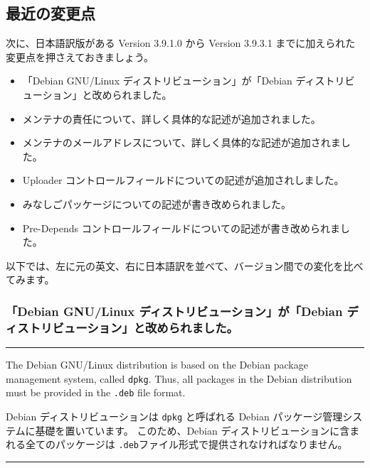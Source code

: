 \documentclass[mingoth,a4paper]{jsarticle}
\begin{document}
\subsection{最近の変更点}
次に、日本語訳版がある Version 3.9.1.0 から Version 3.9.3.1 までに加えられた変更点を押さえておきましょう。

\begin{itemize}
\item 「Debian GNU/Linux ディストリビューション」が「Debian ディストリビューション」と改められました。
\item メンテナの責任について、詳しく具体的な記述が追加されました。
\item メンテナのメールアドレスについて、詳しく具体的な記述が追加されました。
\item Uploader コントロールフィールドについての記述が追加されしました。
\item みなしごパッケージについての記述が書き改められました。
\item Pre-Depends コントロールフィールドについての記述が書き改められました。
\end{itemize}

以下では、左に元の英文、右に日本語訳を並べて、バージョン間での変化を比べてみます。

\clearpage

\subsubsection{ 「Debian GNU/Linux ディストリビューション」が「Debian ディストリビューション」と改められました。}

\vspace{1ex}
\hrule
{}\par
\parbox{0.48\linewidth}{
	  The Debian GNU/Linux distribution is based on the Debian
	  package management system, called {\tt dpkg}. Thus,
	  all packages in the Debian distribution must be provided
	  in the {\tt .deb} file format.
}\hfil 
\parbox{0.48\linewidth}{
	  Debian ディストリビューションは {\tt dpkg}
	  と呼ばれる Debian パッケージ管理システムに基礎を置いています。
	  このため、Debian ディストリビューションに含まれる全てのパッケージは
	   {\tt .deb}ファイル形式で提供されなければなりません。
}
\hrule
\end{document}
